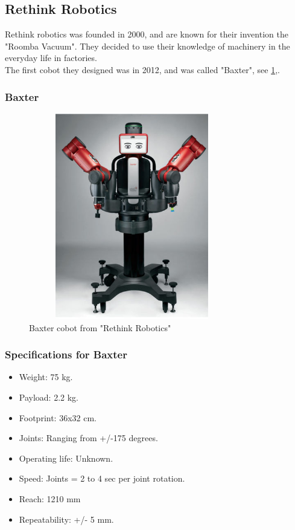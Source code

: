 \subsection{Rethink Robotics}

Rethink robotics was founded in 2000, and are known for their invention the "Roomba Vacuum". They decided to use their knowledge of machinery in the everyday life in factories.\\
The first cobot they designed was in 2012, and was called "Baxter", see \ref{fig:Rethink},\cite{Rethink}.

\subsubsection{Baxter}
\begin{figure}[h!]
    \centering
    \includegraphics[width=9cm, height=9cm]{UR/baxter-robot-1.jpg}
    \caption{Baxter cobot from "Rethink Robotics"\cite{Rethinkbillede}} 
    \label{fig:Rethink}
\end{figure}

\subsubsection{Specifications for Baxter}
\begin{itemize}
    \item Weight: 75 kg.
    \item Payload: 2.2 kg.
    \item Footprint: 36x32 cm.
    \item Joints: Ranging from +/-175 degrees.
    \item Operating life: Unknown.
    \item Speed: Joints = 2 to 4 sec per joint rotation.
    \item Reach: 1210 mm
    \item Repeatability: +/- 5 mm.
\end{itemize}
\cite{Rethinkspec}

